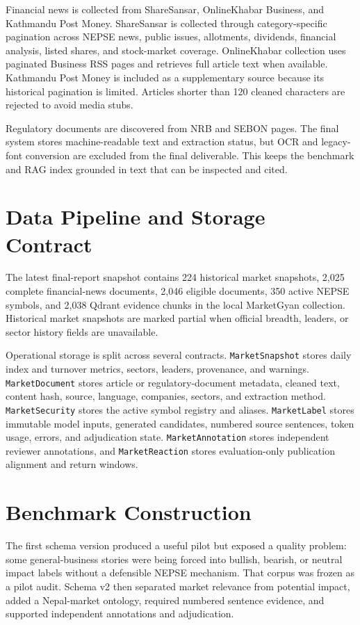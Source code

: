 \documentclass[12pt,a4paper]{report}
\begin{document}
Financial news is collected from ShareSansar, OnlineKhabar Business, and Kathmandu Post Money. ShareSansar is collected through category-specific pagination across NEPSE news, public issues, allotments, dividends, financial analysis, listed shares, and stock-market coverage. OnlineKhabar collection uses paginated Business RSS pages and retrieves full article text when available. Kathmandu Post Money is included as a supplementary source because its historical pagination is limited. Articles shorter than 120 cleaned characters are rejected to avoid media stubs.

Regulatory documents are discovered from NRB and SEBON pages. The final system stores machine-readable text and extraction status, but OCR and legacy-font conversion are excluded from the final deliverable. This keeps the benchmark and RAG index grounded in text that can be inspected and cited.

\section{Data Pipeline and Storage Contract}
The latest final-report snapshot contains 224 historical market snapshots, 2,025 complete financial-news documents, 2,046 eligible documents, 350 active NEPSE symbols, and 2,038 Qdrant evidence chunks in the local MarketGyan collection. Historical market snapshots are marked partial when official breadth, leaders, or sector history fields are unavailable.

Operational storage is split across several contracts. \texttt{MarketSnapshot} stores daily index and turnover metrics, sectors, leaders, provenance, and warnings. \texttt{MarketDocument} stores article or regulatory-document metadata, cleaned text, content hash, source, language, companies, sectors, and extraction method. \texttt{MarketSecurity} stores the active symbol registry and aliases. \texttt{MarketLabel} stores immutable model inputs, generated candidates, numbered source sentences, token usage, errors, and adjudication state. \texttt{MarketAnnotation} stores independent reviewer annotations, and \texttt{MarketReaction} stores evaluation-only publication alignment and return windows.

\section{Benchmark Construction}
The first schema version produced a useful pilot but exposed a quality problem: some general-business stories were being forced into bullish, bearish, or neutral impact labels without a defensible NEPSE mechanism. That corpus was frozen as a pilot audit. Schema v2 then separated market relevance from potential impact, added a Nepal-market ontology, required numbered sentence evidence, and supported independent annotations and adjudication.
\end{document}
